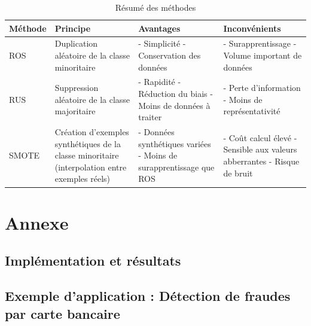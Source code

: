 \documentclass{article}
\begin{document}
\begin{table}[h!]
\centering
\begin{tabular}{|p{1.5cm}|p{4cm}|p{4.5cm}|p{4.2cm}|}
\hline

\centering
\textbf{Méthode} & \textbf{Principe} & \textbf{Avantages} & \textbf{Inconvénients} \\ \hline

\centering
ROS &
Duplication aléatoire de la classe minoritaire &
- Simplicité \newline
- Conservation des données &
- Surapprentissage \newline
- Volume important de \newline données \\ \hline


\centering
RUS &
Suppression aléatoire de la classe majoritaire &
- Rapidité \newline
- Réduction du biais \newline
- Moins de données à traiter &
- Perte d’information \newline
- Moins de représentativité \\ \hline

\centering
SMOTE &
Création d'exemples synthétiques de la classe minoritaire (interpolation entre exemples réels) &
- Données synthétiques \newline variées \newline
- Moins de surapprentissage que ROS &
- Coût calcul élevé \newline
- Sensible aux valeurs \newline abberrantes \newline
- Risque de bruit \\ \hline
\end{tabular}
\caption{Résumé des méthodes}\label{tab:methode}
\end{table}


\newpage

\section{Annexe}

\subsection{Implémentation et résultats}
\subsection*{Exemple d'application : Détection de fraudes par carte bancaire}
\end{document}
